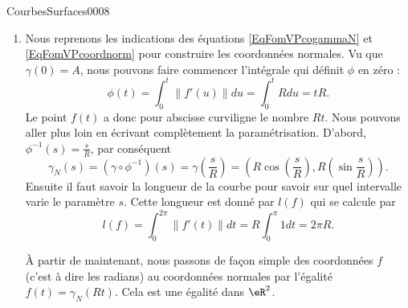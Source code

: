 \begin{corrige}{CourbesSurfaces0008}

	\begin{enumerate}
		\item
				
			Nous reprenons les indications des équations \eqref{EqFomVPcogammaN} et \eqref{EqFomVPcoordnorm} pour construire les coordonnées normales. Vu que $\gamma(0)=A$, nous pouvons faire commencer l'intégrale qui définit $\phi$ en zéro :
			\begin{equation}
				\phi(t)=\int_0^t\| f'(u) \|du=\int_0^t Rdu=tR.
			\end{equation}
			Le point $f(t)$ a donc pour abscisse curviligne le nombre $Rt$. Nous pouvons aller plus loin en écrivant complètement la paramétrisation. D'abord, $\phi^{-1}(s)=\frac{ s }{ R }$, par conséquent
			\begin{equation}
				\gamma_N(s)=(\gamma\circ\phi^{-1})(s)=\gamma(\frac{ s }{ R })=\left( R\cos(\frac{ s }{ R }),R(\sin\frac{ s }{ R }) \right).
			\end{equation}
			Ensuite il faut savoir la longueur de la courbe pour savoir sur quel intervalle varie le paramètre $s$. Cette longueur est donné par $l(f)$ qui se calcule par
			\begin{equation}
				l(f)=\int_0^{2\pi}\| f'(t) \|dt=R\int_0^{\pi}1dt=2\pi R.
			\end{equation}
	
			À partir de maintenant, nous passons de façon simple des coordonnées $f$ (c'est à dire les radians) au coordonnées normales par l'égalité $f(t)=\gamma_N(Rt)$. Cela est une égalité dans $\eR^2$.


\end{enumerate}
\end{corrige}
